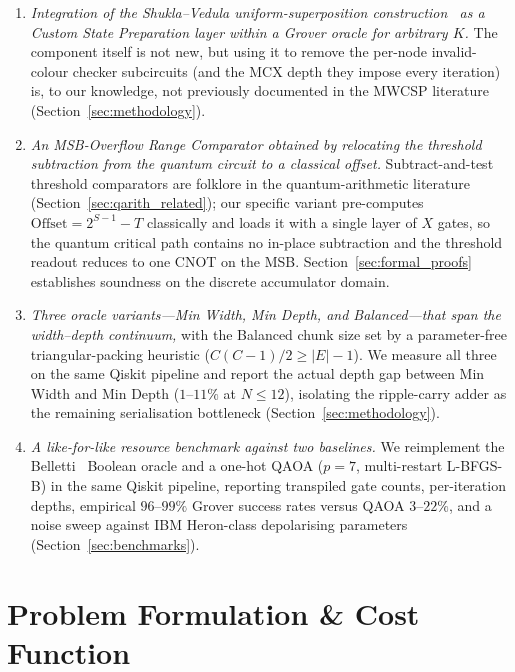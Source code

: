 \documentclass{ieeeaccess}
\begin{document}
\begin{enumerate}
    \item \emph{Integration of the Shukla--Vedula uniform-superposition
    construction~\cite{shukla2024} as a Custom State Preparation layer
    within a Grover oracle for arbitrary $K$.} The component itself is
    not new, but using it to remove the per-node invalid-colour
    checker subcircuits (and the MCX depth they impose every iteration)
    is, to our knowledge, not previously documented in the MWCSP
    literature (Section~\ref{sec:methodology}).

    \item \emph{An MSB-Overflow Range Comparator obtained by relocating
    the threshold subtraction from the quantum circuit to a classical
    offset.} Subtract-and-test threshold comparators are folklore in
    the quantum-arithmetic literature
    (Section~\ref{sec:qarith_related}); our specific variant
    pre-computes $\mathrm{Offset} = 2^{S-1} - T$ classically and loads
    it with a single layer of $X$ gates, so the quantum critical path
    contains no in-place subtraction and the threshold readout reduces
    to one CNOT on the MSB. Section~\ref{sec:formal_proofs}
    establishes soundness on the discrete accumulator domain.

    \item \emph{Three oracle variants---Min Width, Min Depth, and
    Balanced---that span the width--depth continuum,} with the
    Balanced chunk size set by a parameter-free triangular-packing
    heuristic ($C(C-1)/2 \ge |E|-1$). We measure all three on the
    same Qiskit pipeline and report the actual depth gap between Min
    Width and Min Depth ($1$--$11\%$ at $N \le 12$), isolating the
    ripple-carry adder as the remaining serialisation bottleneck
    (Section~\ref{sec:methodology}).

    \item \emph{A like-for-like resource benchmark against two
    baselines.} We reimplement the Belletti~\cite{belletti2025}
    Boolean oracle and a one-hot QAOA ($p{=}7$, multi-restart L-BFGS-B)
    in the same Qiskit pipeline, reporting transpiled gate counts,
    per-iteration depths, empirical $96$--$99\%$ Grover success rates
    versus QAOA $3$--$22\%$, and a noise sweep against IBM Heron-class
    depolarising parameters (Section~\ref{sec:benchmarks}).
\end{enumerate}

\section{Problem Formulation \& Cost Function}
\label{sec:formulation}
\end{document}
